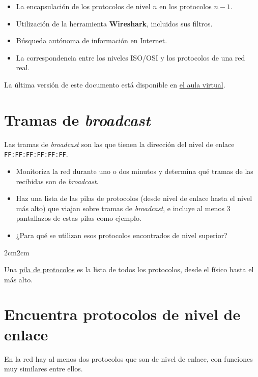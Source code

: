 \documentclass[a4paper]{article}
\begin{document}
\begin{itemize}
\item La encapsulación de los protocolos de nivel \(n\) en los protocolos \(n-1\).
\item Utilización de la herramienta \textbf{Wireshark}, incluidos sus filtros.
\item Búsqueda autónoma de información en Internet.
\item La correspondencia entre los niveles ISO/OSI y los protocolos de una red real.
\end{itemize}

La última versión de este documento está disponible en \href{https://alvarogonzalezsotillo.github.io/apuntes-clase/planificacion-administracion-redes-asir1/apuntes/1/par-1-trabajo-wireshark-ii.pdf}{el aula virtual}.

\clearpage
\section{Tramas de \emph{broadcast}}
\label{sec:org0000003}

Las tramas de \emph{broadcast} son las que tienen la dirección del nivel de enlace \texttt{FF:FF:FF:FF:FF:FF}.

\begin{itemize}
\item Monitoriza la red durante uno o dos minutos y determina qué tramas de las recibidas son de \emph{broadcast}.
\item Haz una lista de las pilas de protocolos (desde nivel de enlace hasta el nivel más alto) que viajan sobre tramas de \emph{broadcast}, e incluye al menos 3 pantallazos de estas pilas como ejemplo.
\item ¿Para qué se utilizan esos protocolos encontrados de nivel superior?
\end{itemize}

\begin{adjustwidth}{2cm}{2cm}
\begin{Aviso}
Una \href{https://en.wikipedia.org/wiki/Protocol\_stack}{pila de protocolos} es la lista de todos los protocolos, desde el físico hasta el más alto.
\end{Aviso}
\end{adjustwidth}
\section{Encuentra protocolos de nivel de enlace}
\label{sec:org0000006}
En la red hay al menos dos protocolos que son de nivel de enlace, con funciones muy similares entre ellos.
\end{document}
